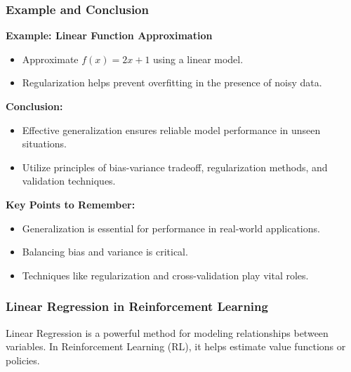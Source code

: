 \documentclass[aspectratio=169]{beamer}
\begin{document}
\begin{frame}[fragile]
    \frametitle{Example and Conclusion}
    \textbf{Example: Linear Function Approximation}
    \begin{itemize}
        \item Approximate \( f(x) = 2x + 1 \) using a linear model.
        \item Regularization helps prevent overfitting in the presence of noisy data.
    \end{itemize}
    
    \textbf{Conclusion:}
    \begin{itemize}
        \item Effective generalization ensures reliable model performance in unseen situations.
        \item Utilize principles of bias-variance tradeoff, regularization methods, and validation techniques.
    \end{itemize}
    
    \textbf{Key Points to Remember:}
    \begin{itemize}
        \item Generalization is essential for performance in real-world applications.
        \item Balancing bias and variance is critical.
        \item Techniques like regularization and cross-validation play vital roles.
    \end{itemize}
\end{frame}

\begin{frame}[fragile]
    \frametitle{Linear Regression in Reinforcement Learning}
    Linear Regression is a powerful method for modeling relationships between variables. In Reinforcement Learning (RL), it helps estimate value functions or policies.
\end{frame}
\end{document}
